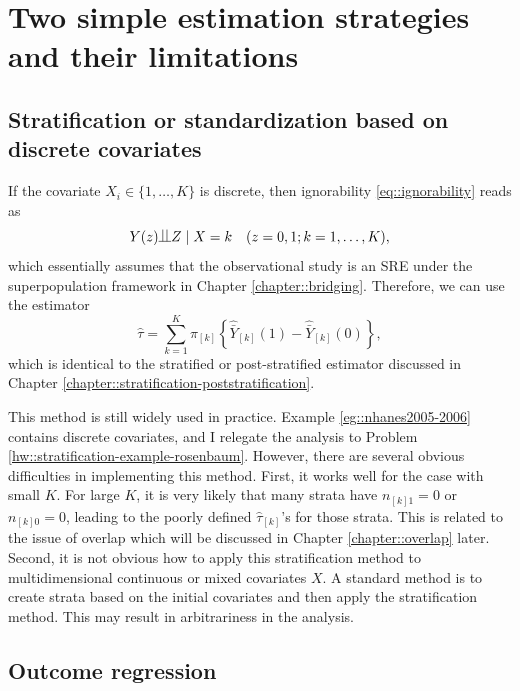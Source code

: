 \section{Two simple estimation strategies and their limitations}


\subsection{Stratification or standardization based on discrete covariates}

If the covariate $X_i \in \{1, \ldots, K \}$ is discrete, then ignorability \eqref{eq::ignorability} reads as 
 $$
 Y(z) \ind Z \mid X = k \quad (z=0,1; k=1,\ldots, K),
 $$
which essentially assumes that the observational study is an SRE under the superpopulation framework in Chapter \ref{chapter::bridging}. Therefore, we can use the estimator
$$
\hat{\tau} = \sum_{k=1}^K \pi_{[k]} \left\{   \hat{\bar{Y}}_{[k]}(1) - \hat{\bar{Y}}_{[k]}(0)   \right\},
$$
which is identical to the stratified or post-stratified estimator discussed in Chapter \ref{chapter::stratification-poststratification}. 


This method is still widely used in practice. Example \ref{eg::nhanes2005-2006} contains discrete covariates, and I relegate the analysis to
Problem \ref{hw::stratification-example-rosenbaum}. However, there are several obvious difficulties in implementing this method. First, it works well for the case with small $K$. For large $K$, it is very likely that many strata have $n_{[k]1}  = 0$ or $n_{[k]0} = 0$, leading to the poorly defined $\hat{\tau}_{[k]}$'s for those strata. This is related to the issue of overlap which will be discussed in Chapter \ref{chapter::overlap} later. Second, it is not obvious how to apply this stratification method to multidimensional continuous or mixed covariates $X$. A standard method is to create strata based on the initial covariates and then apply the stratification method. This may result in arbitrariness in the analysis. 


\subsection{Outcome regression}\label{sec::outcome-regression}


